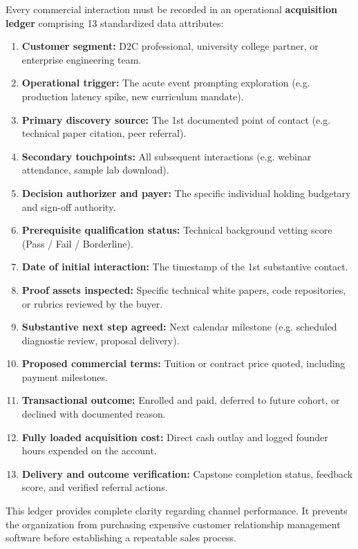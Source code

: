 Every commercial interaction must be recorded in an operational \textbf{acquisition ledger} comprising 13 standardized data attributes:
\begin{enumerate}[leftmargin=*,itemsep=1pt]
  \item \textbf{Customer segment:} D2C professional, university college partner, or enterprise engineering team.
  \item \textbf{Operational trigger:} The acute event prompting exploration (e.g. production latency spike, new curriculum mandate).
  \item \textbf{Primary discovery source:} The 1st documented point of contact (e.g. technical paper citation, peer referral).
  \item \textbf{Secondary touchpoints:} All subsequent interactions (e.g. webinar attendance, sample lab download).
  \item \textbf{Decision authorizer and payer:} The specific individual holding budgetary and sign-off authority.
  \item \textbf{Prerequisite qualification status:} Technical background vetting score (Pass / Fail / Borderline).
  \item \textbf{Date of initial interaction:} The timestamp of the 1st substantive contact.
  \item \textbf{Proof assets inspected:} Specific technical white papers, code repositories, or rubrics reviewed by the buyer.
  \item \textbf{Substantive next step agreed:} Next calendar milestone (e.g. scheduled diagnostic review, proposal delivery).
  \item \textbf{Proposed commercial terms:} Tuition or contract price quoted, including payment milestones.
  \item \textbf{Transactional outcome:} Enrolled and paid, deferred to future cohort, or declined with documented reason.
  \item \textbf{Fully loaded acquisition cost:} Direct cash outlay and logged founder hours expended on the account.
  \item \textbf{Delivery and outcome verification:} Capstone completion status, feedback score, and verified referral actions.
\end{enumerate}

This ledger provides complete clarity regarding channel performance. It prevents the organization from purchasing expensive customer relationship management software before establishing a repeatable sales process.

